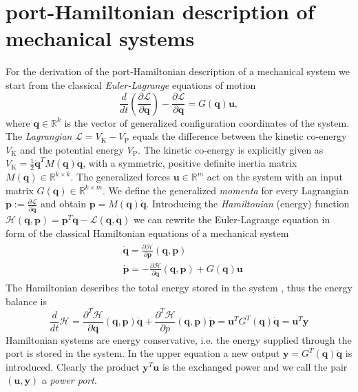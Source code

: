\documentclass[a4paper,twoside, openright,12pt]{report}
\newcommand{\f}[1]{\boldsymbol{#1}}
\newcommand{\g}[1]{\text{#1}}
\begin{document}
\section{port-Hamiltonian description of mechanical systems}\label{S:HSdescription}
For the derivation of the port-Hamiltonian description of a mechanical system we start from the classical \emph{Euler-Lagrange} equations of motion
\begin{equation}
\frac{d}{dt}\left(\frac{\partial \mathcal{L}}{\partial \dot{\f{q}}}\right) - \frac{\partial \mathcal{L}}{\partial \f{q}} = G(\f{q})\f{u},
\end{equation}
where $\f{q} \in \mathbb{R}^k$ is the vector of generalized configuration coordinates of the system. The \emph{Lagrangian} $\mathcal{L} = V_\g{K} - V_\g{P}$ equals the difference between the kinetic co-energy $V_\g{K}$ and the potential energy $V_\g{P}$. The kinetic co-energy is explicitly given as $V_\g{K} = \frac{1}{2} \dot{\f{q}}^T M(\f{q}) \dot{\f{q}}$, with a symmetric, positive definite inertia matrix $M(\f{q}) \in \mathbb{R}^{k \times k}$. The generalized forces $\f{u} \in \mathbb{R}^m$ act on the system with an input matrix $G(\f{q}) \in \mathbb{R}^{k \times m}$. We define the generalized \emph{momenta} for every Lagrangian $\f{p} := \frac{\partial \mathcal{L}}{\partial \dot{\f{q}}}$ and obtain $\f{p} = M(\f{q})\dot{\f{q}}$.
Introducing the \emph{Hamiltonian} (energy) function $\mathcal{H}(\f{q},\f{p}) = \f{p}^T\dot{\f{q}} - \mathcal{L}(\f{q},\dot{\f{q}})$ we can rewrite the Euler-Lagrange equation in form of the classical Hamiltonian equations of a mechanical system \begin{eqnarray}\label{EQ:mechanicalPHS}
	\begin{aligned}
	& \dot{\f{q}} = \frac{\partial \mathcal{H}}{\partial \f{p}}(\f{q},\f{p})\\
	& \dot{\f{p}} = -\frac{\partial \mathcal{H}}{\partial \f{q}}(\f{q},\f{p}) + G(\f{q})\f{u}
	\end{aligned}
\end{eqnarray}
The Hamiltonian describes the total energy stored in the system \cite{vanderSchaft_06}, thus the energy balance is
\begin{equation}
	\frac{d}{dt}\mathcal{H} = \frac{\partial^T \mathcal{H}}{\partial \f{q}}(\f{q},\f{p})\dot{\f{q}} + \frac{\partial^T \mathcal{H}}{\partial p}(\f{q},\f{p})\dot{\f{p}} = \f{u}^TG^T(\f{q})\dot{\f{q}} = \f{u}^T\f{y}
\end{equation}
Hamiltonian systems are energy conservative, i.e. the energy supplied through the port is stored in the system. In the upper equation a new output $\f{y}=G^T(\f{q})\dot{\f{q}}$ is introduced. Clearly the product $\f{y}^T\f{u}$ is the exchanged power and we call the pair $(\f{u},\f{y})$ a \emph{power port}.
\end{document}
